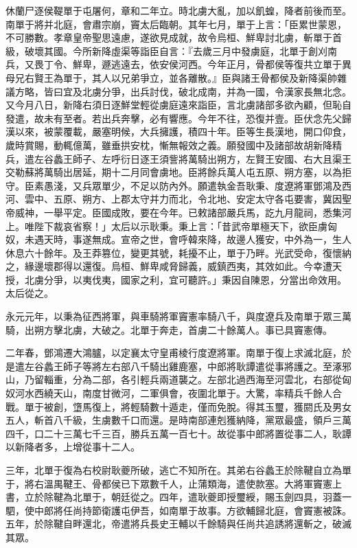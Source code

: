 \begin{pinyinscope}
休蘭尸逐侯鞮單于屯屠何，章和二年立。時北虜大亂，加以飢蝗，降者前後而至。南單于將并北庭，會肅宗崩，竇太后臨朝。其年七月，單于上言：「臣累世蒙恩，不可勝數。孝章皇帝聖思遠慮，遂欲見成就，故令烏桓、鮮卑討北虜，斬單于首級，破壞其國。今所新降虛渠等詣臣自言：『去歲三月中發虜庭，北單于創刈南兵，又畏丁令、鮮卑，遯逃遠去，依安侯河西。今年正月，骨都侯等復共立單于異母兄右賢王為單于，其人以兄弟爭立，並各離散。』臣與諸王骨都侯及新降渠帥雜議方略，皆曰宜及北虜分爭，出兵討伐，破北成南，并為一國，令漢家長無北念。又今月八日，新降右須日逐鮮堂輕從虜庭遠來詣臣，言北虜諸部多欲內顧，但恥自發遣，故未有至者。若出兵奔擊，必有響應。今年不往，恐復并壹。臣伏念先父歸漢以來，被蒙覆載，嚴塞明候，大兵擁護，積四十年。臣等生長漢地，開口仰食，歲時賞賜，動輒億萬，雖垂拱安枕，慚無報效之義。願發國中及諸部故胡新降精兵，遣左谷蠡王師子、左呼衍日逐王須訾將萬騎出朔方，左賢王安國、右大且渠王交勒蘇將萬騎出居延，期十二月同會虜地。臣將餘兵萬人屯五原、朔方塞，以為拒守。臣素愚淺，又兵眾單少，不足以防內外。願遣執金吾耿秉、度遼將軍鄧鴻及西河、雲中、五原、朔方、上郡太守并力而北，令北地、安定太守各屯要害，冀因聖帝威神，一舉平定。臣國成敗，要在今年。已敕諸部嚴兵馬，訖九月龍祠，悉集河上。唯陛下裁哀省察！」太后以示耿秉。秉上言：「昔武帝單極天下，欲臣虜匈奴，未遇天時，事遂無成。宣帝之世，會呼韓來降，故邊人獲安，中外為一，生人休息六十餘年。及王莽篡位，變更其號，耗擾不止，單于乃畔。光武受命，復懷納之，緣邊壞郡得以還復。烏桓、鮮卑咸脅歸義，威鎮西夷，其效如此。今幸遭天授，北虜分爭，以夷伐夷，國家之利，宜可聽許。」秉因自陳恩，分當出命效用。太后從之。

永元元年，以秉為征西將軍，與車騎將軍竇憲率騎八千，與度遼兵及南單于眾三萬騎，出朔方擊北虜，大破之。北單于奔走，首虜二十餘萬人。事已具竇憲傳。

二年春，鄧鴻遷大鴻臚，以定襄太守皇甫棱行度遼將軍。南單于復上求滅北庭，於是遣左谷蠡王師子等將左右部八千騎出雞鹿塞，中郎將耿譚遣從事將護之。至涿邪山，乃留輜重，分為二部，各引輕兵兩道襲之。左部北過西海至河雲北，右部從匈奴河水西繞天山，南度甘微河，二軍俱會，夜圍北單于。大驚，率精兵千餘人合戰。單于被創，墯馬復上，將輕騎數十遁走，僅而免脫。得其玉璽，獲閼氏及男女五人，斬首八千級，生虜數千口而還。是時南部連剋獲納降，黨眾最盛，領戶三萬四千，口二十三萬七千三百，勝兵五萬一百七十。故從事中郎將置從事二人，耿譚以新降者多，上增從事十二人。

三年，北單于復為右校尉耿夔所破，逃亡不知所在。其弟右谷蠡王於除鞬自立為單于，將右溫禺鞬王、骨都侯已下眾數千人，止蒲類海，遣使款塞。大將軍竇憲上書，立於除鞬為北單于，朝廷從之。四年，遣耿夔即授璽綬，賜玉劍四具，羽蓋一駟，使中郎將任尚持節衛護屯伊吾，如南單于故事。方欲輔歸北庭，會竇憲被誅。五年，於除鞬自畔還北，帝遣將兵長史王輔以千餘騎與任尚共追誘將還斬之，破滅其眾。


\end{pinyinscope}
